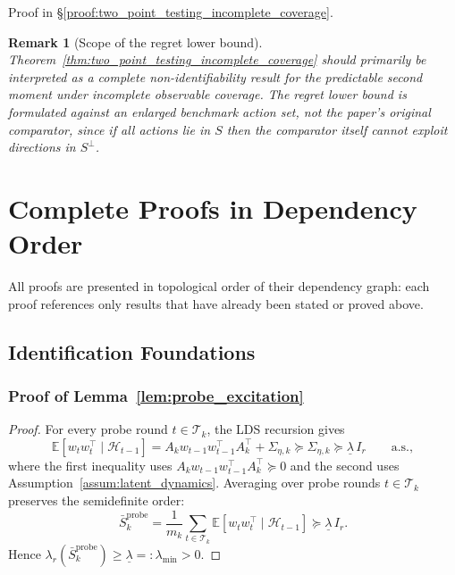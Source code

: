 \documentclass{article}
\newcommand{\E}{\mathbb{E}}
\newcommand{\cH}{\mathcal{H}}
\newcommand{\cT}{\mathcal{T}}
\newtheorem{remark}{Remark}
\begin{document}
Proof in \S\ref{proof:two_point_testing_incomplete_coverage}.

\begin{remark}[Scope of the regret lower bound]
\label{rem:scope_augmented_regret_lb}
Theorem~\ref{thm:two_point_testing_incomplete_coverage} should primarily be interpreted as a complete non-identifiability result for the predictable second moment under incomplete observable coverage. The regret lower bound is formulated against an enlarged benchmark action set, not the paper's original comparator, since if all actions lie in $S$ then the comparator itself cannot exploit directions in $S^\perp$.
\end{remark}

\section{Complete Proofs in Dependency Order}
\label{app:all_proofs}
\label{app:main_proofs}

All proofs are presented in topological order of their dependency graph: each proof references only results that have already been stated or proved above.

\subsection{Identification Foundations}

\subsubsection{Proof of Lemma~\ref{lem:probe_excitation}}
\label{proof:probe_excitation}

\begin{proof}
For every probe round $t \in \cT_k$, the LDS recursion gives
\[
\E[w_t w_t^\top \mid \cH_{t-1}]
= A_k w_{t-1} w_{t-1}^\top A_k^\top + \Sigma_{\eta,k}
\succeq \Sigma_{\eta,k}
\succeq \underline{\lambda}\, I_r
\qquad \text{a.s.},
\]
where the first inequality uses $A_k w_{t-1} w_{t-1}^\top A_k^\top \succeq 0$ and the second uses Assumption~\ref{assum:latent_dynamics}.
Averaging over probe rounds $t \in \cT_k$ preserves the semidefinite order:
\[
\bar S_k^{\mathrm{probe}}
= \frac{1}{m_k}\sum_{t \in \cT_k} \E[w_t w_t^\top \mid \cH_{t-1}]
\succeq \underline{\lambda}\, I_r.
\]
Hence $\lambda_r(\bar S_k^{\mathrm{probe}}) \ge \underline{\lambda} =: \lambda_{\min} > 0$.
\end{proof}
\end{document}
